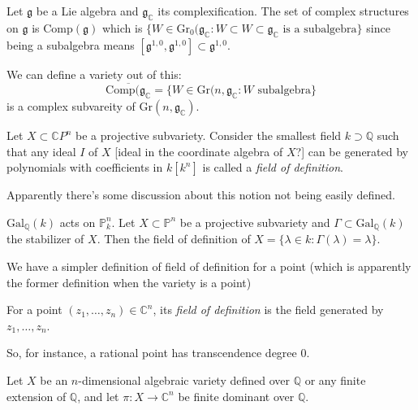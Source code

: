 \begin{definition}
\label{definition-duplicate-2}
Let $\mathfrak{g}$ be a Lie algebra and
$\mathfrak{g}_\mathbb{C}$
its complexification.
The set of complex structures on
$\mathfrak{g}$ is $\text{Comp}(\mathfrak{g})$
which is $\{ W \in
\text{Gr}_0(\mathfrak{g}_\mathbb{C}:
W \subset W \subset
\mathfrak{g}_{\mathbb{C}}\text{ is a
subalgebra}\}$
since being a subalgebra means
$[\mathfrak{g}^{1,0},\mathfrak{g}^{1,0}]
\subset \mathfrak{g}^{1,0}$.
\end{definition}

We can define a variety out of this:
$$
\overline{\text{Comp}(\mathfrak{g}
_{\mathbb{C}}}
=\{W \in
\text{Gr}(n,\mathfrak{g}_{\mathbb{C}}:
\text{$W$ subalgebra}\}
$$
is a complex subvareity of
$\text{Gr}(n,\mathfrak{g}_{\mathbb{C}})$.


\begin{definition}
\label{definition-field-of-defition}
Let $X \subset \mathbb{C}P^n$ be a projective
subvariety.
Consider the smallest field $k \supset
\mathbb{Q}$ such that
any ideal $I$ of $X$ [ideal in the coordinate
algebra of $X$?]
can be generated by polynomials with
coefficients
in $k[k^n]$ is called a {\it field of
definition}.
\end{definition}

\noindent
Apparently there's some discussion about this
notion
not being easily defined.

\begin{lemma}
\label{lemma-duplicate-3}
$\text{Gal}_{\mathbb{Q}}(k)$ acts on
$\mathbb{P}_k^n$.
Let $X \subset \mathbb{P}^n$ be a projective
subvariety
and $\Gamma \subset
\text{Gal}_{\mathbb{Q}}(k)$
the stabilizer of $X$.
Then the field of definition of $X=\{\lambda
\in k:\Gamma(\lambda)=\lambda\}$.
\end{lemma}

\noindent
We have a simpler definition of field of
definition for a point
(which is apparently the former definition
when the variety is a point)

\begin{definition}
\label{definition-field-of-definition-point}
For a point $(z_1,\ldots,z_n) \in
\mathbb{C}^n$, its
{\it field of definition} is the field
generated by $z_1,\ldots,z_n$.
\end{definition}

\noindent
So, for instance, a rational point has
transcendence degree 0.

\begin{remark}
\label{remark-}
Let $X$ be an $n$-dimensional algebraic
variety
defined over $\mathbb{Q}$ or any finite
extension of $\mathbb{Q}$,
and let $\pi:X\to \mathbb{C}^n$ be finite
dominant over $\mathbb{Q}$.
\end{remark}


